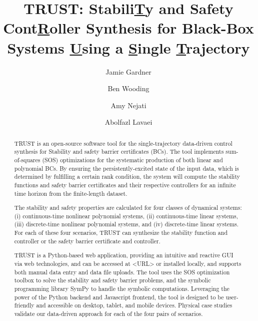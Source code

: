 \documentclass[sigconf]{acmart}
\begin{document}


\title[TRUST: Controller Synthesis for Black-Box Systems Using a Single Trajectory]{TRUST: Stabili\underline{\textbf{T}}y and Safety Cont\underline{\textbf{R}}oller Synthesis for Black-Box Systems \underline{\textbf{U}}sing a \underline{\textbf{S}}ingle \underline{\textbf{T}}rajectory}

\author{Jamie Gardner}

\author{Ben Wooding}

\author{Amy Nejati}

\author{Abolfazl Lavaei}

\begin{abstract}
TRUST is an open-source software tool for the single-trajectory data-driven control synthesis for Stability and safety barrier certificates (BCs).
The tool implements sum-of-squares (SOS) optimizations for the systematic production of both linear and polynomial BCs. By ensuring the persistently-excited state of the input data, which is determined by fulfilling a certain rank condition, the system will compute the stability functions and safety barrier certificates and their respective controllers for an infinite time horizon from the finite-length dataset.

The stability and safety properties are calculated for four classes of dynamical systems: (i) continuous-time nonlinear polynomial systems, (ii) continuous-time linear systems, (iii) discrete-time nonlinear polynomial systems, and (iv) discrete-time linear systems.
For each of these four scenarios, TRUST can synthesize the stability function and controller or the safety barrier certificate and controller.

TRUST is a Python-based web application, providing an intuitive and reactive GUI via web technologies, and can be accessed at <URL> or installed locally, and supports both manual data entry and data file uploads.
The tool uses the SOS optimization toolbox to solve the stability and safety barrier problems, and the symbolic programming library SymPy to handle the symbolic computations.
Leveraging the power of the Python backend and Javascript frontend, the tool is designed to be user-friendly and accessible on desktop, tablet, and mobile devices.
Physical case studies validate our data-driven approach for each of the four pairs of scenarios.
\end{abstract}
\end{document}
